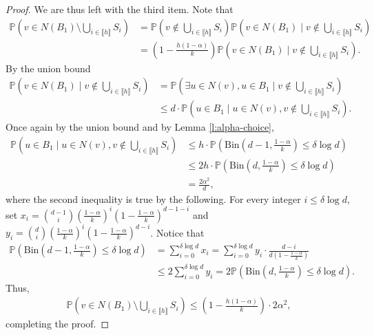 \documentclass[notitlepage]{scrartcl}
\newcommand{\br}[1]{\llbracket{#1}\rrbracket}
\begin{document}
\begin{proof}
We are thus left with the third item. Note that
\begin{align*}
    \mathbb{P}\left(v\in N(B_1)\setminus \bigcup_{i\in \br{h}}S_i\right)&=\mathbb{P}\left(v\notin \bigcup_{i\in \br{h}}S_i\right)\mathbb{P}\left(v\in N(B_1)\mid v\notin \bigcup_{i\in \br{h}}S_i\right)\\
    &=\left(1-\frac{h(1-\alpha)}{k}\right)\mathbb{P}\left(v\in N(B_1)\mid v\notin \bigcup_{i\in \br{h}}S_i\right).
\end{align*}
By the union bound 
\begin{align*}
    \mathbb{P}\left(v\in N(B_1)\mid v\notin \bigcup_{i\in \br{h}}S_i\right)&=\mathbb{P}\left(\exists u\in N(v), u\in B_1\mid v\notin \bigcup_{i\in \br{h}}S_i\right)\\
    &\le d\cdot \mathbb{P}\left(u\in B_1\mid u\in N(v), v\notin \bigcup_{i\in \br{h}}S_i\right).
\end{align*}
Once again by the union bound and by Lemma \ref{l:alpha-choice},
\begin{align*}
    \mathbb{P}\left(u\in B_1\mid u\in N(v), v\notin \bigcup_{i\in \br{h}}S_i\right)&\le h\cdot \mathbb{P}\left(\text{Bin}\left(d-1, \frac{1-\alpha}{k}\right)\le \delta \log d\right)\\
    &\le 2h\cdot \mathbb{P}\left(\text{Bin}\left(d, \frac{1-\alpha}{k}\right)\le \delta \log d\right)\\
    &=\frac{2\alpha^2}{d},
\end{align*}
where the second inequality is true by the following. For every integer $i \le \delta \log d$, set $x_i = \binom{d-1}{i} \left(\frac{1-\alpha}{k}\right)^i\left(1 - \frac{1-\alpha}{k}\right)^{d-1-i}$ and $y_i = \binom{d}{i} \left(\frac{1-\alpha}{k}\right)^i\left(1 - \frac{1-\alpha}{k}\right)^{d-i}$. Notice that
\begin{align*}
    \mathbb{P}\left(\text{Bin}\left(d-1, \frac{1-\alpha}{k}\right)\le \delta \log d\right) &= \sum_{i = 0}^{\delta \log d} x_i = \sum_{i = 0}^{\delta \log d} y_i \cdot \frac{d-i}{d\left(1-\frac{1-\alpha}{k}\right)} \\&\le 2 \sum_{i = 0}^{\delta \log d} y_i = 2 \mathbb{P}\left(\text{Bin}\left(d, \frac{1-\alpha}{k}\right)\le \delta \log d\right).
\end{align*}
Thus,
\begin{align*}
       \mathbb{P}\left(v\in N(B_1)\setminus \bigcup_{i\in \br{h}}S_i\right)\le \left(1-\frac{h(1-\alpha)}{k}\right)\cdot2\alpha^2,
\end{align*}
completing the proof.
\end{proof}
\end{document}
